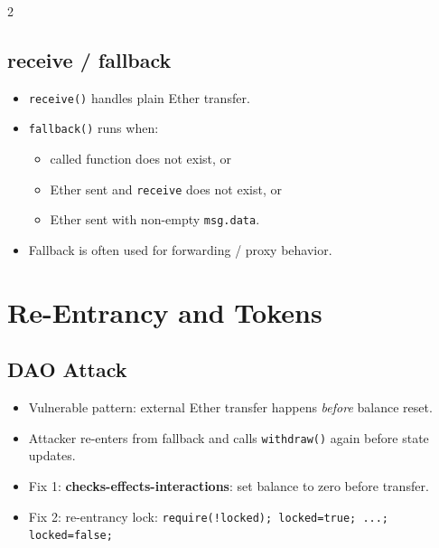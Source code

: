 \documentclass[10pt,a4paper]{article}
\newcommand{\term}[1]{\textbf{#1}}
\newcommand{\code}[1]{\texttt{#1}}
\begin{document}
\begin{multicols*}{2}
\subsection*{receive / fallback}
\begin{itemize}
\item \code{receive()} handles plain Ether transfer.
\item \code{fallback()} runs when:
\begin{itemize}
\item called function does not exist, or
\item Ether sent and \code{receive} does not exist, or
\item Ether sent with non-empty \code{msg.data}.
\end{itemize}
\item Fallback is often used for forwarding / proxy behavior.
\end{itemize}

\section*{Re-Entrancy and Tokens}
\subsection*{DAO Attack}
\begin{itemize}
\item Vulnerable pattern: external Ether transfer happens \emph{before} balance reset.
\item Attacker re-enters from fallback and calls \code{withdraw()} again before state updates.
\item Fix 1: \term{checks-effects-interactions}: set balance to zero before transfer.
\item Fix 2: re-entrancy lock:
\code{require(!locked); locked=true; ...; locked=false;}
\end{itemize}


\end{multicols*}
\end{document}
